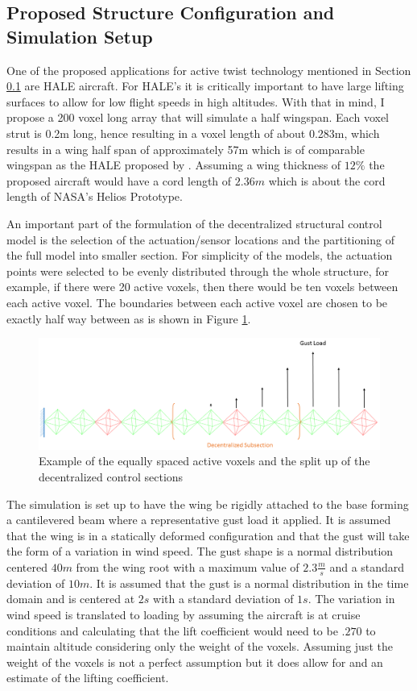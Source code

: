 \documentclass[11pt]{ucthesis}
\begin{document}
\subsection{Proposed Structure Configuration and Simulation Setup}
\label{sec:struct}
One of the proposed applications for active twist technology mentioned in Section \ref{sec:struct} are HALE aircraft. For HALE's it is critically important to have large lifting surfaces to allow for low flight speeds in high altitudes. With that in mind, I propose a 200 voxel long array that will simulate a half wingspan. Each voxel strut is 0.2m long, hence resulting in a voxel length of about 0.283m, which results in a wing half span of approximately 57m which is of comparable wingspan as the HALE proposed by \cite{goraj1999design}. Assuming a wing thickness of $12\%$ the proposed aircraft would have a cord length of $2.36 m$ which is about the cord length of NASA's Helios Prototype. \cite{domain2016nasa}

An important part of the formulation of the decentralized structural control model is the selection of the actuation/sensor locations and the partitioning of the full model into smaller section. For simplicity of the models, the actuation points were selected to be evenly distributed through the whole structure, for example, if there were 20 active voxels, then there would be ten voxels between each active voxel. The boundaries between each active voxel are chosen to be exactly half way between as is shown in Figure \ref{fig:simSetup}.

\begin{figure}[thpb]
\centering
\includegraphics[width=1\linewidth]{Figures/SimulationSetup.png}
\caption{Example of the equally spaced active voxels and the split up of the decentralized control sections}
\label{fig:simSetup}
\end{figure}

The simulation is set up to have the wing be rigidly attached to the base forming a cantilevered beam where a representative gust load it applied. It is assumed that the wing is in a statically deformed configuration and that the gust will take the form of a variation in wind speed. The gust shape is a normal distribution centered $40m$ from the wing root with a maximum value of $2.3 \frac{m}{s}$ and a standard deviation of $10m$. It is assumed that the gust is a normal distribution in the time domain and is centered at $2s$ with a standard deviation of $1s$. The variation in wind speed is translated to loading by assuming the aircraft is at cruise conditions and calculating that the lift coefficient would need to be $.270$ to maintain altitude considering only the weight of the voxels. Assuming just the weight of the voxels is not a perfect assumption but it does allow for and an estimate of the lifting coefficient. 
\end{document}
